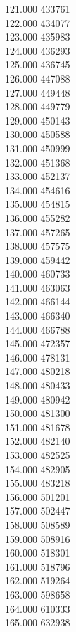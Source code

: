 { 121.000	433761 \\
 122.000	434077 \\
 123.000	435983 \\
 124.000	436293 \\
 125.000	436745 \\
 126.000	447088 \\
 127.000	449448 \\
 128.000	449779 \\
 129.000	450143 \\
 130.000	450588 \\
 131.000	450999 \\
 132.000	451368 \\
 133.000	452137 \\
 134.000	454616 \\
 135.000	454815 \\
 136.000	455282 \\
 137.000	457265 \\
 138.000	457575 \\
 139.000	459442 \\
 140.000	460733 \\
 141.000	463063 \\
 142.000	466144 \\
 143.000	466340 \\
 144.000	466788 \\
 145.000	472357 \\
 146.000	478131 \\
 147.000	480218 \\
 148.000	480433 \\
 149.000	480942 \\
 150.000	481300 \\
 151.000	481678 \\
 152.000	482140 \\
 153.000	482525 \\
 154.000	482905 \\
 155.000	483218 \\
 156.000	501201 \\
 157.000	502447 \\
 158.000	508589 \\
 159.000	508916 \\
 160.000	518301 \\
 161.000	518796 \\
 162.000	519264 \\
 163.000	598658 \\
 164.000	610333 \\
 165.000	632938 \\
}
